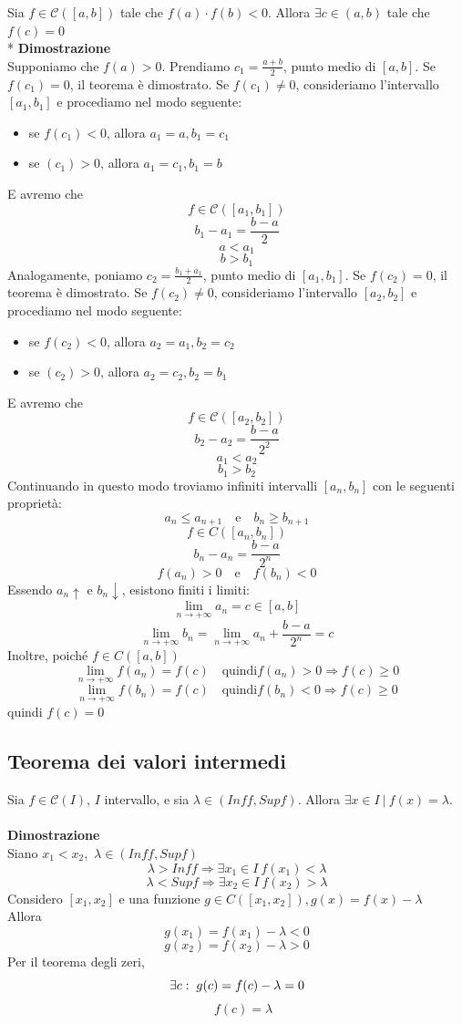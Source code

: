 \documentclass[12pt]{article}
\begin{document}
Sia $f \in \mathscr{C}([a,b])$ tale che $f(a)\cdot f(b)<0$. Allora $\exists c \in (a,b)$ tale che $f(c) = 0$\\*
\textbf{Dimostrazione}\\
Supponiamo che $f(a) > 0$. Prendiamo $c_1 = \frac{a+b}{2}$, punto medio di $[a,b]$. Se $f(c_1)=0$, il teorema è dimostrato. Se $f(c_1) \neq 0$, consideriamo l'intervallo $[a_1, b_1]$ e procediamo nel modo seguente:
\begin{itemize}
  \item se $f(c_1) < 0$, allora $a_1 = a, b_1 = c_1$
  \item se $(c_1) > 0$, allora $a_1 = c_1, b_1 = b$
\end{itemize}
E avremo che 
\[ f \in \mathscr{C}([a_1,b_1]) \]
\[b_1 - a_1 = \frac{b-a}{2}\]
\[a<a_1\] 
\[b>b_1\]
Analogamente, poniamo $c_2 = \frac{b_1 + a_1}{2}$, punto medio di $[a_1,b_1]$. Se $f(c_2)=0$, il teorema è dimostrato. Se $f(c_2) \neq 0$, consideriamo l'intervallo $[a_2, b_2]$ e procediamo nel modo seguente:
\begin{itemize}
  \item se $f(c_2) < 0$, allora $a_2 = a_1, b_2 = c_2$
  \item se $(c_2) > 0$, allora $a_2 = c_2, b_2 = b_1$
\end{itemize}
E avremo che 
\[ f \in \mathscr{C}([a_2,b_2]) \]
\[b_2 - a_2 = \frac{b-a}{2^2}\]
\[a_1<a_2\] 
\[b_1>b_2\] \newpage
Continuando in questo modo troviamo infiniti intervalli $[a_n, b_n]$ con le seguenti proprietà:
\[ a_n \leq a_{n+1} \quad \text{e} \quad b_n \geq b_{n+1} \]
\[ f \in C([a_n,b_n]) \]
\[ b_n - a_n = \frac{b-a}{2^n} \] 
\[ f(a_n)>0 \quad \text{e} \quad f(b_n) < 0 \] 
Essendo ${a_n}\uparrow$ e ${b_n}\downarrow$, esistono finiti i limiti:\\
\[ \lim_{n \to +\infty} a_n = c \in [a,b] \]
\[ \lim_{n \to +\infty} b_n = \lim_{n \to +\infty} a_n + \frac{b-a}{2^n} = c \]
Inoltre, poiché $f \in C([a,b])$
\[ \lim_{n \to +\infty} f(a_n) = f(c)\quad \text{quindi} f(a_n) >0 \Rightarrow f(c) \geq 0 \]
\[ \lim_{n \to +\infty} f(b_n) = f(c) \quad \text{quindi} f(b_n) <0 \Rightarrow f(c) \geq 0 \]
quindi $f(c) = 0$

\subsection{Teorema dei valori intermedi}
Sia $f \in \mathscr{C}(I)$, $I$ intervallo, e sia $\lambda \in (Inf f, Sup f)$.
Allora $\exists x \in I\ |\ f(x) = \lambda$. \\ \\
\textbf{Dimostrazione}\\
Siano $x_1 < x_2$,\ $\lambda \in (Inf f, Sup f)$\\
\[ \lambda > Inf f \Rightarrow \exists x_1 \in I\ f(x_1) < \lambda \]
\[ \lambda < Sup f \Rightarrow \exists x_2 \in I\ f(x_2) > \lambda \]
Considero $[x_1,x_2]$ e una funzione $g \in C([x_1,x_2]), g(x) = f(x) - \lambda$\\
Allora 
\[g(x_1) = f(x_1) - \lambda < 0\] 
\[g(x_2) = f(x_2) - \lambda > 0\]
Per il teorema degli zeri,
\[\exists c: \hspace*{0.1cm} g(c) = f(c) - \lambda = 0 \]
\[\quad f(c) = \lambda \]
\end{document}
